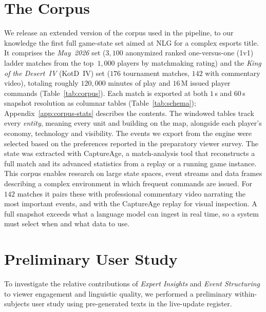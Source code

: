 \documentclass[11pt]{article}
\begin{document}
\section{The Corpus}
\label{sec:corpus}
We release an extended version of the corpus used in the pipeline, to our knowledge the first full game-state set aimed at NLG for a complex esports title. It comprises the \emph{May~2026} set ($3{,}100$ anonymized ranked one-versus-one (1v1) ladder matches from the top~$1{,}000$ players by matchmaking rating) and the \emph{King of the Desert~IV} (KotD~IV) set ($176$ tournament matches, $142$ with commentary video), totaling roughly $120{,}000$ minutes of play and $16$\,M issued player commands (Table~\ref{tab:corpus}). Each match is exported at both $1$\,s and $60$\,s snapshot resolution as columnar tables (Table~\ref{tab:schema}); Appendix~\ref{app:corpus-stats} describes the contents. The windowed tables track every \emph{entity}, meaning every unit and building on the map, alongside each player's economy, technology and visibility. The events we export from the engine were selected based on the preferences reported in the preparatory viewer survey. The state was extracted with CaptureAge, a match-analysis tool that reconstructs a full match and its advanced statistics from a replay or a running game instance.
This corpus enables research on large state spaces, event streams and data frames describing a complex environment in which frequent commands are issued. For $142$ matches it pairs these with professional commentary video narrating the most important events, and with the CaptureAge replay for visual inspection. A full snapshot exceeds what a language model can ingest in real time, so a system must select when and what data to use.

\section{Preliminary User Study}
\label{sec:study}
To investigate the relative contributions of \emph{Expert Insights} and \emph{Event Structuring} to viewer engagement and linguistic quality, we performed a preliminary within-subjects user study using pre-generated texts in the live-update register.
\end{document}
